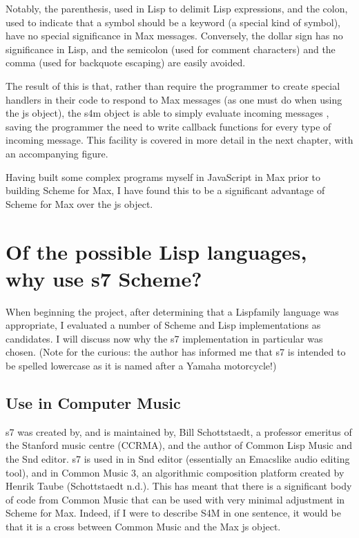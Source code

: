 \documentclass[letterpaper,10pt,english]{sphinxmanual}
\begin{document}
\sphinxAtStartPar
Notably, the parenthesis, used in Lisp to delimit Lisp expressions, and the colon, used to indicate that a symbol should be a keyword (a special kind of symbol),
have no special significance in Max messages.
Conversely, the dollar sign has no significance in Lisp, and the semi\sphinxhyphen{}colon (used for comment characters) and the comma
(used for back\sphinxhyphen{}quote escaping) are easily avoided.

\sphinxAtStartPar
The result of this is that, rather than require the programmer to create special handlers in their code to respond to Max messages
(as one must do when using the js object), the s4m object is able to simply evaluate incoming messages ,
saving the programmer the need to write callback functions for every type of incoming message.
This facility is covered in more detail in the next chapter, with an accompanying figure.

\sphinxAtStartPar
Having built some complex programs myself in JavaScript in Max prior to building Scheme for Max,
I have found this to be a significant advantage of Scheme for Max over the js object.


\section{Of the possible Lisp languages, why use s7 Scheme?}
\label{\detokenize{design:of-the-possible-lisp-languages-why-use-s7-scheme}}
\sphinxAtStartPar
When beginning the project, after determining that a Lisp\sphinxhyphen{}family language was appropriate, I evaluated a number of
Scheme and Lisp implementations as candidates.
I will discuss now why the s7 implementation in particular was chosen.
(Note for the curious: the author has informed me that s7 is intended to be spelled lowercase
as it is named after a Yamaha motorcycle!)


\subsection{Use in Computer Music}
\label{\detokenize{design:use-in-computer-music}}
\sphinxAtStartPar
s7 was created by, and is maintained by, Bill Schottstaedt, a professor emeritus of the Stanford music centre (CCRMA),
and the author of Common Lisp Music and the Snd editor.
s7 is used in in Snd editor (essentially an Emacs\sphinxhyphen{}like audio editing tool), and in Common Music 3, an algorithmic composition
platform created by Henrik Taube (Schottstaedt n.d.).
This has meant that there is a significant body of code from Common Music that can be used with very minimal adjustment in Scheme for Max.
Indeed, if I were to describe S4M in one sentence, it would be that it is a cross between Common Music and the Max js object.
\end{document}
